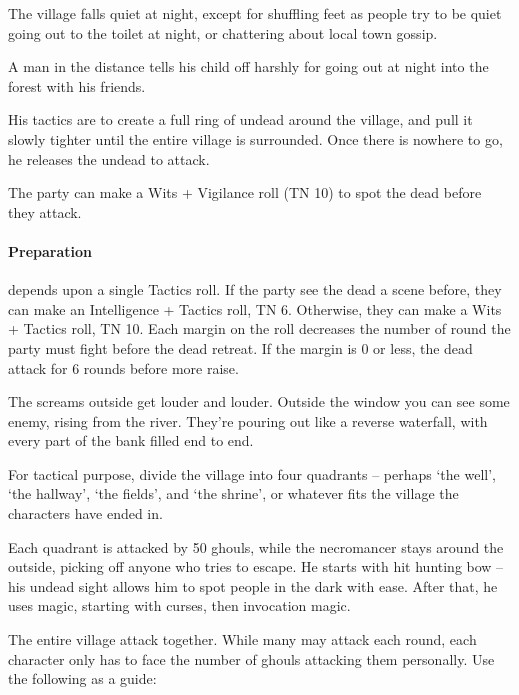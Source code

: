 \begin{multicols}{2}
\begin{boxtext}
  The village falls quiet at night, except for shuffling feet as people try to be quiet going out to the toilet at night, or chattering about local town gossip.

  A man in the distance tells his child off harshly for going out at night into the forest with his friends.
\end{boxtext}

His tactics are to create a full ring of undead around the village, and pull it slowly tighter until the entire village is surrounded.
Once there is nowhere to go, he releases the undead to attack.

The party can make a Wits + Vigilance roll (TN 10) to spot the dead before they attack.

\paragraph{Preparation} depends upon a single Tactics roll.
If the party see the dead a scene before, they can make an Intelligence + Tactics roll, TN 6.
Otherwise, they can make a Wits + Tactics roll, TN 10.
Each margin on the roll decreases the number of round the party must fight before the dead retreat.
If the margin is 0 or less, the dead attack for 6 rounds before more raise.

\begin{boxtext}

  The screams outside get louder and louder.
  Outside the window you can see some enemy, rising from the river.
  They're pouring out like a reverse waterfall, with every part of the bank filled end to end.

\end{boxtext}

For tactical purpose, divide the village into four quadrants -- perhaps `the well', `the hallway', `the fields', and `the shrine', or whatever fits the village the characters have ended in.

Each quadrant is attacked by 50 ghouls, while the necromancer stays around the outside, picking off anyone who tries to escape.  He starts with hit hunting bow -- his undead sight allows him to spot people in the dark with ease.  After that, he uses magic, starting with curses, then invocation magic.

The entire village attack together.
While many may attack each round, each character only has to face the number of ghouls attacking them personally.
Use the following as a guide:


\end{multicols}
